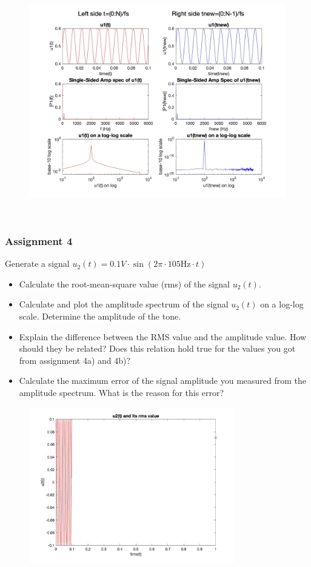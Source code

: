 \documentclass[
	a4paper,
	11pt,
]{article}
\begin{document}
\begin{figure}[htb!]
    \centerline{\includegraphics[width=18cm]{A2/a3.all.jpg}}
\end{figure}

\newpage


\\
\subsubsection{Assignment 4}
Generate a signal \( u_2(t) = 0.1 V \cdot\sin(2\pi\cdot105\text{Hz}\cdot t) \)
\\
\begin{itemize}
\item Calculate the root-mean-square value (rms) of the signal \(u_2(t)\).
\item Calculate and plot the amplitude spectrum of the signal \(u_2(t)\) on a log-log scale. Determine the
amplitude of the tone.
\item Explain the difference between the RMS value and the amplitude value. How should they be related? Does this relation hold true for the values you got from assignment 4a) and 4b)?
\item Calculate the maximum error of the signal amplitude you measured from the amplitude spectrum. What is the reason for this error?
\end{itemize}
\newpage



\begin{figure}[htb!]
    \centerline{\includegraphics[width=9cm]{A4/a4.image1.jpg}}
\end{figure}
\end{document}
